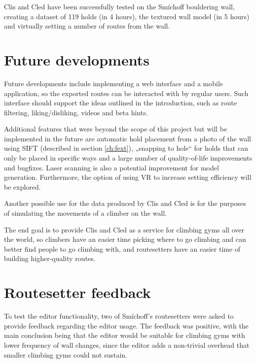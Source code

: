 \label{sec:conclusion}
Clis and Cled have been successfully tested on the Smíchoff bouldering wall, creating a dataset of 119 holds (in 4 hours), the textured wall model (in 5 hours) and virtually setting a number of routes from the wall.

\setcounter{secnumdepth}{0}

\section{Future developments}
Future developments include implementing a web interface and a mobile application, so the exported routes can be interacted with by regular users.
Such interface should support the ideas outlined in the introduction, such as route filtering, liking/disliking, videos and beta hints.

Additional features that were beyond the scope of this project but will be implemented in the future are automatic hold placement from a photo of the wall using SIFT (described in section \ref{ch:fext}), „snapping to hole“ for holds that can only be placed in specific ways and a large number of quality-of-life improvements and bugfixes.
Laser scanning is also a potential improvement for model generation.
Furthermore, the option of using VR to increase setting efficiency will be explored.

Another possible use for the data produced by Clis and Cled is for the purposes of simulating the movements of a climber on the wall.

The end goal is to provide Clis and Cled as a service for climbing gyms all over the world, so climbers have an easier time picking where to go climbing and can better find people to go climbing with, and routesetters have an easier time of building higher-quality routes.

\section{Routesetter feedback}
To test the editor functionality, two of Smíchoff's routesetters were asked to provide feedback regarding the editor usage.
The feedback was positive, with the main conclusion being that the editor would be suitable for climbing gyms with lower frequency of wall changes, since the editor adds a non-trivial overhead that smaller climbing gyms could not sustain.

\setcounter{secnumdepth}{3}
